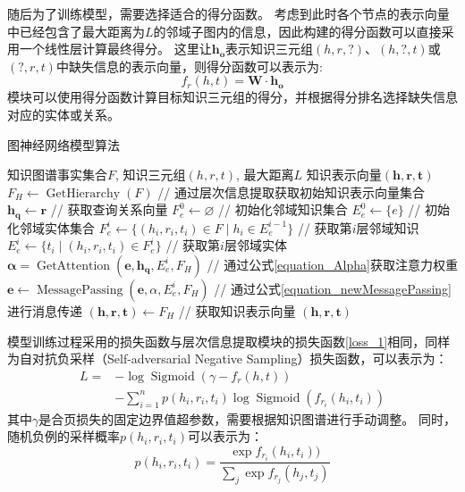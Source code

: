\documentclass[algorithmlist, AutoFakeBold, AutoFakeSlant, figurelist, tablelist, nomlist, engineering, openany]{seuthesix} %
\begin{document}
随后为了训练模型，需要选择适合的得分函数。
考虑到此时各个节点的表示向量中已经包含了最大距离为$L$的邻域子图内的信息，因此构建的得分函数可以直接采用一个线性层计算最终得分。
这里让$\bm{h_o}$表示知识三元组$(h, r, ?)$、$(h, ?, t)$或$(?, r, t)$中缺失信息的表示向量，则得分函数可以表示为:
\begin{equation}
  f_{r}(h, t) = \mathbf{W} \cdot \bm{h_o}
  \label{equation_GNNScore}
\end{equation}
模块可以使用得分函数计算目标知识三元组的得分，并根据得分排名选择缺失信息对应的实体或关系。

\begin{algorithm}[t]
	\caption{图神经网络模型算法}  
	\label{algorithm_GNN}
	\begin{algorithmic}[1]
  \Require 知识图谱事实集合$F$, 知识三元组$(h, r, t)$, 最大距离$L$
  \Ensure 知识表示向量$(\bm{h}, \bm{r}, \bm{t})$
  \State $F_H \leftarrow \operatorname{GetHierarchy}(F)$ // 通过层次信息提取获取初始知识表示向量集合
  \State $\bm{h_q} \leftarrow \bm{r}$ // 获取查询关系向量
  \State $F_{e}^{0} \leftarrow \varnothing$ // 初始化邻域知识集合
  \State $E_{e}^{0} \leftarrow \{e\}$ // 初始化邻域实体集合
  \State $F_{e}^{i} \leftarrow \{(h_i, r_i, t_i) \in F \mid h_i \in E_{e}^{i-1}\}$ // 获取第$i$层邻域知识
  \State $E_{e}^{i} \leftarrow \{t_i \mid (h_i, r_i, t_i) \in F_{e}^{i}\}$ // 获取第$i$层邻域实体
  \State $\bm{\alpha} = \operatorname{GetAttention}(\bm{e}, \bm{h_q}, E_{e}^{i}, F_H)$ // 通过公式\ref{equation_Alpha}获取注意力权重
  \State $\bm{e} \leftarrow \operatorname{MessagePassing}(\bm{e}, \alpha, E_{e}^{i}, F_H)$ // 通过公式\ref{equation_newMessagePassing}进行消息传递
  \EndFor
  \EndFor
  \EndFor
  \State $(\bm{h}, \bm{r}, \bm{t}) \leftarrow F_H$ // 获取知识表示向量
  \State \Return $(\bm{h}, \bm{r}, \bm{t})$
	\end{algorithmic}
\end{algorithm} 

模型训练过程采用的损失函数与层次信息提取模块的损失函数\ref{loss_1}相同，同样为自对抗负采样（Self-adversarial Negative Sampling）损失函数，可以表示为：
\begin{equation}
  \begin{aligned}
  L= & -\log \operatorname{Sigmoid}\left(\gamma-f_r(h, t)\right) \\
  & -\sum_{i=1}^n p\left(h_i, r_i, t_i\right) \log \operatorname{Sigmoid}(f_{r_i}(h_i, t_i))
  \end{aligned}
\end{equation}
其中$\gamma$是合页损失的固定边界值超参数，需要根据知识图谱进行手动调整。
同时，随机负例的采样概率$p(h_i, r_i, t_i)$可以表示为：
\begin{equation}
  p(h_i, r_i, t_i)=\frac{\exp f_{r_i}(h_i, t_i))}{\sum_j \exp f_{r_j}(h_j, t_j)}
\end{equation}
\end{document}
